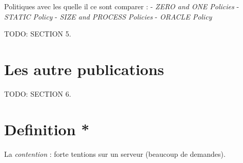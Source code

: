 \documentclass[10pt, a4paper]{article}
\begin{document}
Politiques avec les quelle il ce sont comparer :
- \emph{ZERO and ONE Policies}
- \emph{STATIC Policy}
- \emph{SIZE and PROCESS Policies}
- \emph{ORACLE Policy}

TODO: SECTION 5.

\section{Les autre publications}

TODO: SECTION 6.

\section{Definition *}

La \emph{contention} : forte tentions sur un serveur (beaucoup de demandes).
\end{document}
